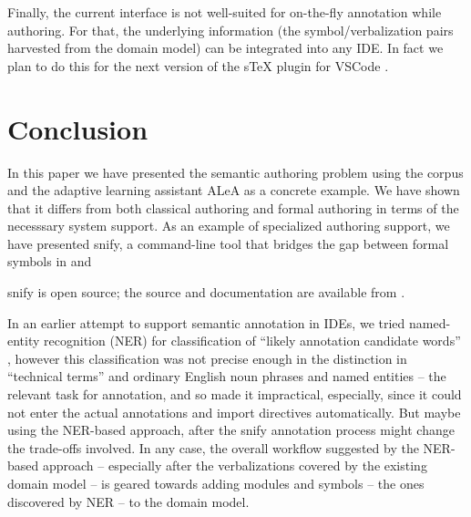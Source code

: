 \documentclass{llncs}
\newcommand\ALeA{\textsf{ALeA}\xspace}
\newcommand\snify{\textsf{snify}\xspace}
\begin{document}
Finally, the current interface is not well-suited for on-the-fly annotation while
authoring.  For that, the underlying information (the symbol/verbalization pairs harvested
from the domain model) can be integrated into any IDE. In fact we plan to do this for the
next version of the sTeX plugin for VSCode \cite{sTeX-IDE:git}.

\section{Conclusion}

In this paper we have presented the semantic authoring problem using the \sTeX corpus and
the adaptive learning assistant \ALeA as a concrete example. We have shown that it differs
from both classical authoring and formal authoring in terms of the necesssary system
support. As an example of specialized authoring support, we have presented \snify, a
command-line tool that bridges the gap between formal symbols in \sTeX and 

\snify is open source; the source and documentation are available from
\cite{stextools:git}.

In an earlier attempt to support semantic annotation in IDEs, we tried named-entity
recognition (NER) for classification of ``likely annotation candidate words''
\cite{hutterer:msc23}, however this classification was not precise enough in the
distinction in ``technical terms'' and ordinary English noun phrases and named entities --
the relevant task for annotation, and so made it impractical, especially, since it could
not enter the actual annotations and import directives automatically. But maybe using the
NER-based approach, after the \snify annotation process might change the trade-offs
involved. In any case, the overall workflow suggested by the NER-based approach --
especially after the verbalizations covered by the existing domain model -- is geared towards adding modules and symbols -- the ones discovered by NER
-- to the domain model. 

\printbibliography
\end{document}
